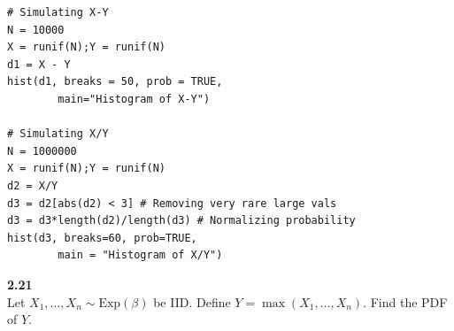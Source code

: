 \begin{lstlisting}[style=RSyntax, title=R]
# Simulating X-Y
N = 10000
X = runif(N);Y = runif(N)
d1 = X - Y
hist(d1, breaks = 50, prob = TRUE,
        main="Histogram of X-Y")

# Simulating X/Y
N = 1000000
X = runif(N);Y = runif(N)
d2 = X/Y
d3 = d2[abs(d2) < 3] # Removing very rare large vals
d3 = d3*length(d2)/length(d3) # Normalizing probability
hist(d3, breaks=60, prob=TRUE,
        main = "Histogram of X/Y")
\end{lstlisting}

\bigskip\noindent
\textbf{2.21}\\  %
Let $X_1,\ldots,X_n\sim\text{Exp}(\beta)$ be IID. Define $Y = \max(X_1,\ldots,X_n)$.
Find the PDF of $Y$.

